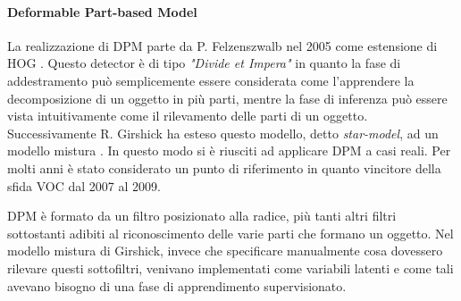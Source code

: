 \paragraph{Deformable Part-based Model} 
La realizzazione di \ac{DPM} parte da P. Felzenszwalb nel 2005 come estensione di \ac{HOG} \cite{felzenszwalb2008discriminatively}. Questo detector è di tipo \textit{"Divide et Impera"} in quanto la fase di addestramento può semplicemente essere considerata come l'apprendere la decomposizione di un oggetto in più parti, mentre la fase di inferenza può essere vista intuitivamente come il rilevamento delle parti di un oggetto. 
Successivamente R. Girshick ha esteso questo modello, detto \textit{star-model}, ad un modello mistura \cite{felzenszwalb2010cascade, felzenszwalb2009object, girshick2011object, girshick2012rigid}. In questo modo si è riusciti ad applicare \ac{DPM} a casi reali. Per molti anni è stato considerato un punto di riferimento in quanto vincitore della sfida \ac{VOC} dal 2007 al 2009.

\ac{DPM} è formato da un filtro posizionato alla radice, più tanti altri filtri sottostanti adibiti al riconoscimento delle varie parti che formano un oggetto. Nel modello mistura di Girshick, invece che specificare manualmente cosa dovessero rilevare questi sottofiltri, venivano implementati come variabili latenti e come tali avevano bisogno di una fase di apprendimento supervisionato. 
